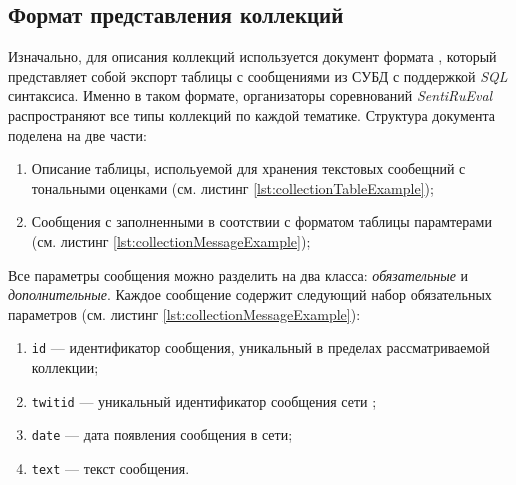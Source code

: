     \subsection{Формат представления коллекций}

    Изначально, для описания коллекций используется документ формата \xml,
    который представляет собой экспорт таблицы с сообщениями из СУБД с поддержкой
    {\it SQL} синтаксиса.
    Именно в таком формате, организаторы соревнований {\it SentiRuEval}
    распространяют все типы коллекций по каждой тематике. Структура документа
    поделена на две части:
    \begin{enumerate}
        \item Описание таблицы, испольуемой для хранения текстовых сообещний с
            тональными оценками (см. листинг \ref{lst:collectionTableExample});
        \item Сообщения с заполненными в соотствии с форматом таблицы
            парамтерами (см. листинг \ref{lst:collectionMessageExample});
    \end{enumerate}

    \newpage
    \lstset{style=xml}
    \newpage
    

    \lstset{style=xml}
    

    Все параметры сообщения можно разделить на два класса: {\it обязательные} и
    {\it дополнительные}. Каждое сообщение содержит следующий набор
    обязательных параметров (см. листинг \ref{lst:collectionMessageExample}):
    \begin{enumerate}
        \item {\tt id} --- идентификатор сообщения, уникальный в пределах рассматриваемой коллекции;
        \item {\tt twitid} --- уникальный идентификатор сообщения сети \twitter;
        \item {\tt date} --- дата появления сообщения в сети;
        \item {\tt text} --- текст сообщения.
    \end{enumerate}

